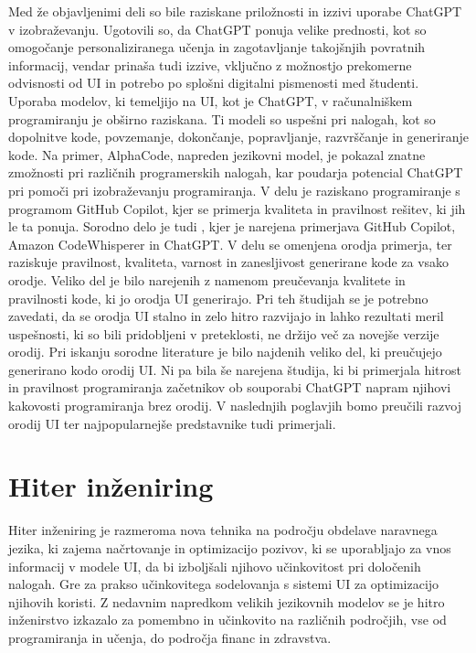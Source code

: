\documentclass[12pt,a4paper]{book}
\begin{document}
\cite{app13095783}

Med že objavljenimi deli so bile raziskane priložnosti in izzivi uporabe ChatGPT v izobraževanju. Ugotovili so, da ChatGPT ponuja velike prednosti, kot so omogočanje personaliziranega učenja in zagotavljanje takojšnjih povratnih informacij, vendar prinaša tudi izzive, vključno z možnostjo prekomerne odvisnosti od UI in potrebo po splošni digitalni pismenosti med študenti.
Uporaba modelov, ki temeljijo na UI, kot je ChatGPT, v računalniškem programiranju je obširno raziskana. Ti modeli so uspešni pri nalogah, kot so dopolnitve kode, povzemanje, dokončanje, popravljanje, razvrščanje in generiranje kode. Na primer, AlphaCode, napreden jezikovni model, je pokazal znatne zmožnosti pri različnih programerskih nalogah, kar poudarja potencial ChatGPT pri pomoči pri izobraževanju programiranja. \cite{rudolph2023war}
\newline
V delu \textcite{MORADIDAKHEL2023111734} je raziskano programiranje s programom GitHub Copilot, kjer se primerja kvaliteta in pravilnost rešitev, ki jih le ta ponuja.
Sorodno delo je tudi \textcite{yetistiren2023evaluating}, kjer je narejena primerjava GitHub Copilot, Amazon CodeWhisperer in ChatGPT. V delu se omenjena orodja primerja, ter raziskuje pravilnost, kvaliteta, varnost in zanesljivost generirane kode za vsako orodje.
Veliko del je bilo narejenih z namenom preučevanja kvalitete in pravilnosti kode, ki jo orodja UI generirajo. Pri teh študijah se je potrebno zavedati, da se orodja UI stalno in zelo hitro razvijajo in lahko rezultati meril uspešnosti, ki so bili pridobljeni v preteklosti, ne držijo več za novejše verzije orodij.
Pri iskanju sorodne literature je bilo najdenih veliko del, ki preučujejo generirano kodo orodij UI. Ni pa bila še narejena študija, ki bi primerjala hitrost in pravilnost programiranja začetnikov ob souporabi ChatGPT napram njihovi kakovosti programiranja brez orodij. V naslednjih poglavjih bomo preučili razvoj orodij UI ter najpopularnejše predstavnike tudi primerjali.


\chapter{Hiter inženiring}

Hiter inženiring je razmeroma nova tehnika na področju obdelave naravnega jezika, ki zajema načrtovanje in optimizacijo pozivov, ki se uporabljajo za vnos informacij v modele UI, da bi izboljšali njihovo učinkovitost pri določenih nalogah. \cite{wang2024prompt} Gre za prakso učinkovitega sodelovanja s sistemi UI za optimizacijo njihovih koristi. Z nedavnim napredkom velikih jezikovnih modelov se je hitro inženirstvo izkazalo za pomembno in učinkovito na različnih področjih, vse od programiranja in učenja, do področja financ in zdravstva.
\cite{info:doi/10.2196/50638}
\end{document}
